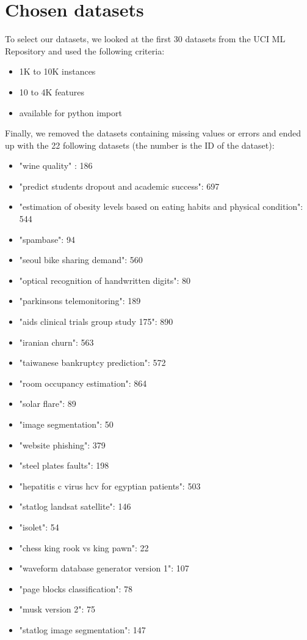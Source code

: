 \documentclass[10pt, a4paper]{article}
\begin{document}
\section{Chosen datasets}
To select our datasets, we looked at the first 30 datasets from the UCI ML Repository and used the following criteria:
\begin{itemize}
    \item 1K to 10K instances
    \item 10 to 4K features
    \item available for python import
\end{itemize}
Finally, we removed the datasets containing missing values or errors and ended up with the 22 following datasets (the number is the ID of the dataset):
\begin{itemize}
    \item "wine quality" : 186
    \item "predict students dropout and academic success": 697
    \item "estimation of obesity levels based on eating habits and physical condition": 544
    \item "spambase": 94
    \item "seoul bike sharing demand": 560
    \item "optical recognition of handwritten digits": 80
    \item "parkinsons telemonitoring": 189
    \item "aids clinical trials group study 175": 890
    \item "iranian churn": 563
    \item "taiwanese bankruptcy prediction": 572
    \item "room occupancy estimation": 864
    \item "solar flare": 89
    \item "image segmentation": 50
    \item "website phishing": 379
    \item "steel plates faults": 198
    \item "hepatitis c virus hcv for egyptian patients": 503
    \item "statlog landsat satellite": 146
    \item "isolet": 54
    \item "chess king rook vs king pawn": 22
    \item "waveform database generator version 1": 107
    \item "page blocks classification": 78
    \item "musk version 2": 75
    \item "statlog image segmentation": 147
\end{itemize}
\newpage
\end{document}
